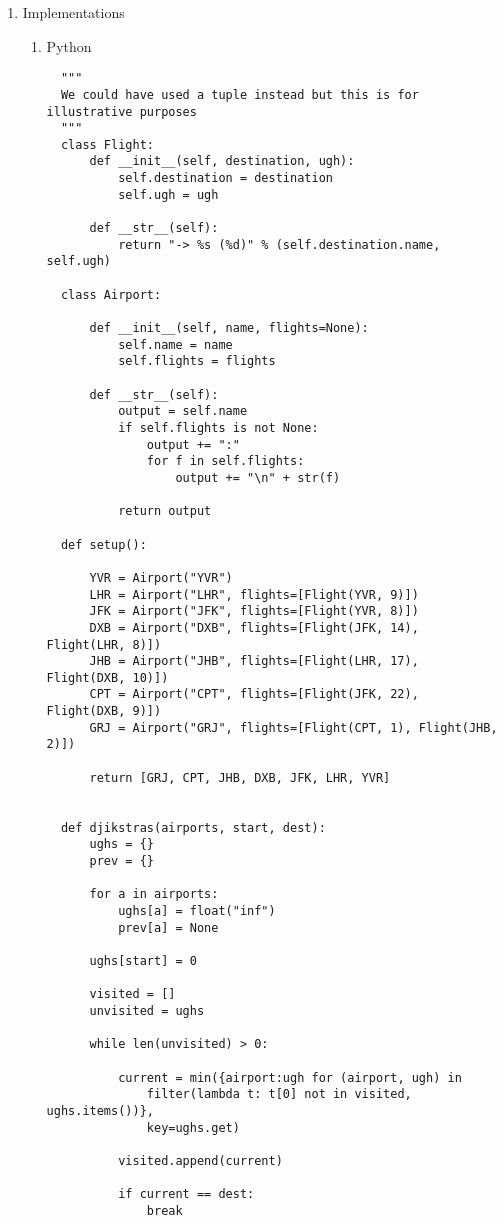 \documentclass[11pt]{article}
\begin{document}
\begin{enumerate}
\item Implementations
\label{sec:org3d41452}
\begin{enumerate}
\item Python
\label{python}
\begin{verbatim}
  """
  We could have used a tuple instead but this is for illustrative purposes
  """
  class Flight:
      def __init__(self, destination, ugh):
          self.destination = destination
          self.ugh = ugh

      def __str__(self):
          return "-> %s (%d)" % (self.destination.name, self.ugh)

  class Airport:

      def __init__(self, name, flights=None):
          self.name = name
          self.flights = flights

      def __str__(self):
          output = self.name
          if self.flights is not None:
              output += ":"
              for f in self.flights:
                  output += "\n" + str(f) 

          return output

  def setup():

      YVR = Airport("YVR")
      LHR = Airport("LHR", flights=[Flight(YVR, 9)])
      JFK = Airport("JFK", flights=[Flight(YVR, 8)])
      DXB = Airport("DXB", flights=[Flight(JFK, 14), Flight(LHR, 8)])
      JHB = Airport("JHB", flights=[Flight(LHR, 17), Flight(DXB, 10)])
      CPT = Airport("CPT", flights=[Flight(JFK, 22), Flight(DXB, 9)])
      GRJ = Airport("GRJ", flights=[Flight(CPT, 1), Flight(JHB, 2)])

      return [GRJ, CPT, JHB, DXB, JFK, LHR, YVR]


  def djikstras(airports, start, dest):
      ughs = {}
      prev = {}

      for a in airports:
          ughs[a] = float("inf")
          prev[a] = None

      ughs[start] = 0

      visited = []
      unvisited = ughs

      while len(unvisited) > 0:
          
          current = min({airport:ugh for (airport, ugh) in 
              filter(lambda t: t[0] not in visited, ughs.items())},
              key=ughs.get)

          visited.append(current)

          if current == dest:
              break


\end{verbatim}
\end{enumerate}
\end{enumerate}
\end{document}
